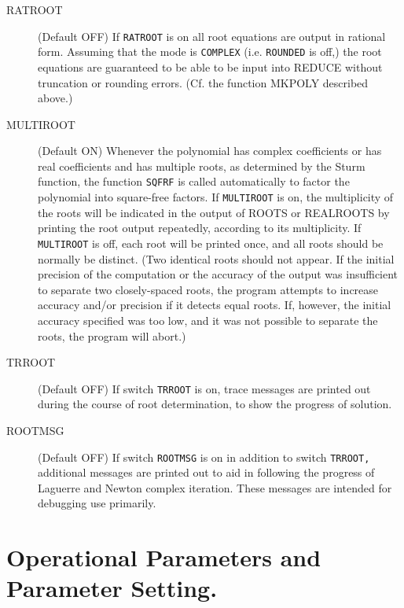 \begin{description}
\item[RATROOT] (Default OFF) If {\tt RATROOT} is on all root equations are
output in rational form.  Assuming that the mode is {\tt COMPLEX} (i.e.
{\tt ROUNDED} is off,) the root equations are
guaranteed to be able to be input into REDUCE without truncation or
rounding errors. (Cf. the function MKPOLY described above.)

\item[MULTIROOT] (Default ON) Whenever the polynomial has complex
coefficients or has real coefficients and has multiple roots, as
 determined by the Sturm function, the function {\tt SQFRF}
is called automatically to factor the polynomial into square-free factors.
If {\tt MULTIROOT} is on, the multiplicity of the roots will be indicated
in the output of ROOTS or REALROOTS by printing the root output
repeatedly, according to its multiplicity.  If {\tt MULTIROOT} is off,
each root will be printed once, and all roots should be normally be
distinct. (Two identical roots should not appear.  If the initial
precision of the computation or the accuracy of the output was
insufficient to separate two closely-spaced roots, the program attempts to
increase accuracy and/or precision if it detects equal roots.  If,
however, the initial accuracy specified was too low, and it was not
possible to separate the roots, the program will abort.)

\item[TRROOT] (Default OFF) If switch {\tt TRROOT} is on, trace messages
are printed out during the course of root determination, to show the
progress of solution.

 \item[ROOTMSG] (Default OFF) If switch
{\tt ROOTMSG} is on in addition to switch {\tt TRROOT,} additional
messages are printed out to aid in following the progress of Laguerre and
Newton complex iteration.  These messages are intended for debugging use
primarily.


\end{description}


\section{Operational Parameters and Parameter Setting.}


